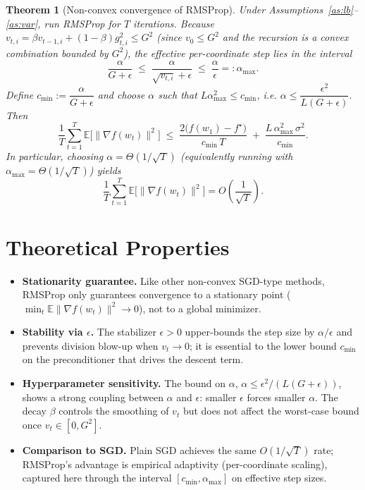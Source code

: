 \documentclass[11pt]{article}
\newtheorem{theorem}{Theorem}
\begin{document}
\begin{theorem}[Non-convex convergence of RMSProp]\label{thm:main}
Under Assumptions~\ref{as:lb}--\ref{as:var}, run RMSProp for $T$ iterations.
Because $v_{t,i} = \beta v_{t-1,i} + (1-\beta)g_{t,i}^2 \le G^2$ (since
$v_0\le G^2$ and the recursion is a convex combination bounded by $G^2$),
the effective per-coordinate step lies in the interval
\[
\frac{\alpha}{G+\epsilon} \;\le\; \frac{\alpha}{\sqrt{v_{t,i}}+\epsilon}
\;\le\; \frac{\alpha}{\epsilon} =: \alpha_{\max}.
\]
Define $c_{\min} := \dfrac{\alpha}{G+\epsilon}$ and choose $\alpha$ such
that $L\alpha_{\max}^2 \le c_{\min}$, i.e.
$\alpha \le \dfrac{\epsilon^2}{L(G+\epsilon)}$.
Then
\[
\frac{1}{T}\sum_{t=1}^{T} \mathbb{E}\big[\|\nabla f(w_t)\|^2\big]
\;\le\;
\frac{2\big(f(w_1)-f^\star\big)}{c_{\min}\,T}
\;+\;
\frac{L\,\alpha_{\max}^2\,\sigma^2}{c_{\min}}.
\]
In particular, choosing $\alpha = \Theta(1/\sqrt{T})$ (equivalently
running with $\alpha_{\max}=\Theta(1/\sqrt T)$) yields
\[
\frac{1}{T}\sum_{t=1}^{T} \mathbb{E}\big[\|\nabla f(w_t)\|^2\big]
= O\!\left(\frac{1}{\sqrt{T}}\right).
\]
\end{theorem}

\section*{Theoretical Properties}

\begin{itemize}
  \item \textbf{Stationarity guarantee.} Like other non-convex SGD-type
        methods, RMSProp only guarantees convergence to a stationary point
        ($\min_t \mathbb{E}\|\nabla f(w_t)\|^2 \to 0$), not to a global
        minimizer.
  \item \textbf{Stability via $\epsilon$.} The stabilizer $\epsilon>0$
        upper-bounds the step size by $\alpha/\epsilon$ and prevents
        division blow-up when $v_t\to 0$; it is essential to the lower
        bound $c_{\min}$ on the preconditioner that drives the descent term.
  \item \textbf{Hyperparameter sensitivity.} The bound on $\alpha$,
        $\alpha\le \epsilon^2/(L(G+\epsilon))$, shows a strong coupling
        between $\alpha$ and $\epsilon$: smaller $\epsilon$ forces smaller
        $\alpha$. The decay $\beta$ controls the smoothing of $v_t$ but does
        not affect the worst-case bound once $v_t\in[0,G^2]$.
  \item \textbf{Comparison to SGD.} Plain SGD achieves the same
        $O(1/\sqrt T)$ rate; RMSProp's advantage is empirical adaptivity
        (per-coordinate scaling), captured here through the interval
        $[c_{\min},\alpha_{\max}]$ on effective step sizes.
\end{itemize}
\end{document}
